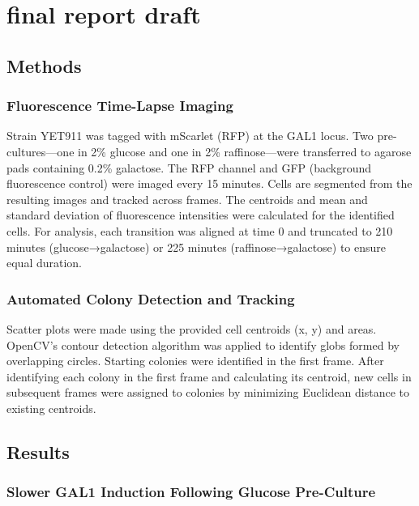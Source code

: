 \section{final report draft}\label{final-report-draft}

\subsection{Methods}\label{methods}

\subsubsection{Fluorescence Time-Lapse
Imaging}\label{fluorescence-time-lapse-imaging}

Strain YET911 was tagged with mScarlet (RFP) at the GAL1 locus. Two
pre-cultures---one in 2\% glucose and one in 2\% raffinose---were
transferred to agarose pads containing 0.2\% galactose. The RFP channel
and GFP (background fluorescence control) were imaged every 15 minutes.
Cells are segmented from the resulting images and tracked across frames.
The centroids and mean and standard deviation of fluorescence
intensities were calculated for the identified cells. For analysis, each
transition was aligned at time 0 and truncated to 210 minutes
(glucose→galactose) or 225 minutes (raffinose→galactose) to ensure equal
duration.

\subsubsection{Automated Colony Detection and
Tracking}\label{automated-colony-detection-and-tracking}

Scatter plots were made using the provided cell centroids (x, y) and
areas. OpenCV's contour detection algorithm was applied to identify
globs formed by overlapping circles. Starting colonies were identified
in the first frame. After identifying each colony in the first frame and
calculating its centroid, new cells in subsequent frames were assigned
to colonies by minimizing Euclidean distance to existing centroids.

\subsection{Results}\label{results}

\subsubsection{Slower GAL1 Induction Following Glucose
Pre-Culture}\label{slower-gal1-induction-following-glucose-pre-culture}

